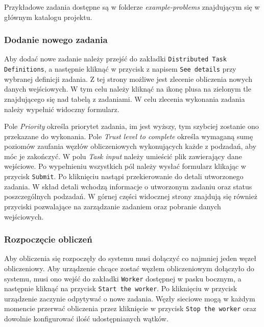 \documentclass[a4paper,11pt,twoside]{report}
\theoremstyle{definition}
\begin{document}
        Przykładowe zadania dostępne są w folderze \textit{example-problems} znajdującym się w głównym katalogu projektu.
        
        
        \subsubsection{Dodanie nowego zadania}
        \label{distributed-task-add-guide}
        
        Aby dodać nowe zadanie należy przejść do zakładki \texttt{Distributed Task Definitions}, a następnie kliknąć w przycisk z napisem \texttt{See details} przy wybranej definicji zadania.
        Z tej strony możliwe jest zlecenie obliczenia nowych danych wejściowych.
        W tym celu należy kliknąć na ikonę plusa na zielonym tle znajdującego się nad tabelą z zadaniami.
        W celu zlecenia wykonania zadania należy wypełnić widoczny formularz.
        
        Pole \textit{Priority} określa priorytet zadania, im jest wyższy, tym szybciej zostanie ono przekazane do wykonania.
        Pole \textit{Trust level to complete} określa wymaganą sumę poziomów zaufania węzłów obliczeniowych wykonujących każde z podzadań, aby móc je zakończyć. 
        W polu \textit{Task input} należy umieścić plik zawierający dane wejściowe.
        Po wypełnieniu wszystkich pól należy wysłać formularz klikając w przycisk \texttt{Submit}. Po kliknięciu nastąpi przekierowanie do detali utworzonego zadania. 
        W skład detali wchodzą informacje o utworzonym zadaniu oraz status poszczególnych podzadań. W górnej części widocznej strony znajdują się również przyciski pozwalające na zarządzanie zadaniem oraz pobranie danych wejściowych.
        
        \subsubsection{Rozpoczęcie obliczeń}
        
        Aby obliczenia się rozpoczęły do systemu musi dołączyć co najmniej jeden węzeł obliczeniowy. Aby urządzenie chcące zostać węzłem obliczeniowym dołączyło do systemu, musi ono wejść do zakładki \texttt{Worker} dostępnej w pasku bocznym, a następnie kliknąć na przycisk \texttt{Start the worker}.
        Po kliknięciu w przycisk urządzenie zaczynie odpytywać o nowe zadania.
        Węzły sieciowe mogą w każdym momencie przerwać obliczenia przez kliknięcie w przycisk \texttt{Stop the worker} oraz dowolnie konfigurować ilość udostępnianych wątków. 
        
\end{document}
